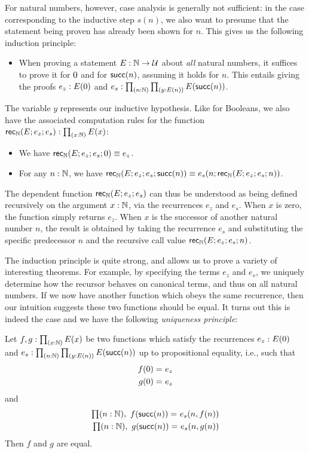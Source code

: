For natural numbers, however, case analysis is generally not sufficient: in the case corresponding to the inductive step $s(n)$, we also want to presume that the statement being proven has already been shown for $n$.
This gives us the following induction principle:
\begin{itemize}
\item When proving a statement $E : \mathbb{N} \to \mathcal{U}$ about \emph{all} natural numbers, it suffices to prove it for $0$ and for $\mathsf{succ}(n)$, assuming it holds
for $n$. This entails giving the proofs $e_z : E(0)$ and $e_s : \prd{n : \nat}{y : E(n)} E(\s(n))$.
\end{itemize}
The variable $y$ represents our inductive hypothesis. Like for Booleans, we also have the associated computation rules for the function $\rec\nat(E;e_z;e_s) : \prd{x:\nat} E(x)$:
\begin{itemize}
\item We have $\mathsf{rec}_{\mathbb{N}}(E;e_z;e_s;0) \equiv e_z$.
\item For any $n : \mathbb{N}$, we have $\mathsf{rec}_{\mathbb{N}}(E;e_z;e_s;\mathsf{succ}(n)) \equiv e_s(n;\mathsf{rec}_{\mathbb{N}}(E;e_z;e_s;n))$.
\end{itemize}
The dependent function $\mathsf{rec}_{\mathbb{N}}(E;e_z;e_s)$ can thus be understood as being defined recursively on the argument $x : \mathbb{N}$, via the recurrences $e_z$ and $e_s$.
When $x$ is zero, the function simply returns $e_z$.
When $x$ is the successor of another natural number $n$, the result is obtained by taking the recurrence $e_s$ and substituting the specific predecessor $n$ and the recursive call value $\mathsf{rec}_{\mathbb{N}}(E;e_z;e_s;n)$.


The induction principle is quite strong, and allows us to prove a variety of interesting theorems. For example, by specifying the terms $e_z$ and $e_s$, we uniquely determine how the recursor behaves on canonical terms, and thus on all natural numbers. If we now have another function which obeys the same recurrence, then our intuition suggests these two functions should be equal. It turns out this is indeed the case and we have the following \emph{uniqueness principle}:

\begin{thm}\label{thm:nat-uniq}
Let $f,g : \prd{x:\nat} E(x)$ be two functions which satisfy the recurrences $e_z : E(0)$ and $e_s : \prd{n : \nat}{y : E(n)} E(\s(n))$ up to propositional equality, i.e., such that
\begin{align*}
f(0) =_{} e_z \\ 
g(0) =_{} e_z
\end{align*}
and 
\begin{align*}
\prd{n : \nat} \id{f(\s(n))}{e_s(n, f(n))} \\
\prd{n : \nat} \id{g(\s(n))}{e_s(n, g(n))}
\end{align*}
Then $f$ and $g$ are equal. 
\end{thm}


